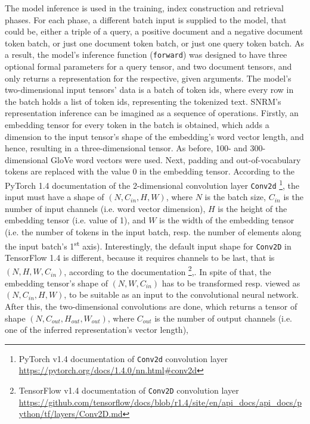 The model inference is used in the training, index construction and retrieval phases.
For each phase, a different batch input is supplied to the model, that could be,
    either a triple of a query, a positive document and a negative document token batch,
    or just one document token batch, or just one query token batch.
As a result, the model's inference function (\texttt{forward}) was designed to have three optional formal parameters for
    a query tensor, and two document tensors, and only returns a representation for
    the respective, given arguments.
The model's two-dimensional input tensors' data is a batch of token ids, where every row in the batch 
    holds a list of token ids, representing the tokenized text.
SNRM's representation inference can be imagined as a sequence of operations.
Firstly, an embedding tensor for every token in the batch is obtained, which adds a dimension
    to the input tensor's shape of the embedding's word vector length, and hence, resulting 
    in a three-dimensional tensor.
As before, 100- and 300- dimensional GloVe word vectors were used.
Next, padding and out-of-vocabulary tokens are replaced with the value 0 in the embedding tensor.
According to the PyTorch 1.4 documentation of the 2-dimensional convolution layer \texttt{Conv2d}
    \footnote{PyTorch v1.4 documentation of \texttt{Conv2d} convolution layer \url{https://pytorch.org/docs/1.4.0/nn.html\#conv2d}},
    the input must have a shape of $(N, C_{in}, H, W)$, 
    where $N$ is the batch size,
    $C_{in}$ is the number of input channels (i.e. word vector dimension),
    $H$ is the height of the embedding tensor (i.e. value of 1), and 
    $W$ is the width of the embedding tensor (i.e. the number of tokens in the input batch, 
    resp. the number of elements along the input batch's 1\textsuperscript{st} axis).
Interestingly, the default input shape for \texttt{Conv2D} in TensorFlow 1.4 is different,
    because it requires channels to be last, that is $(N, H, W, C_{in})$,
    according to the documentation
    \footnote{TensorFlow v1.4 documentation of \texttt{Conv2D} convolution layer \url{https://github.com/tensorflow/docs/blob/r1.4/site/en/api_docs/api_docs/python/tf/layers/Conv2D.md}},.
In spite of that, the embedding tensor's shape of $(N, W, C_{in})$ has to be transformed resp. 
    viewed as $(N, C_{in}, H, W)$, to be suitable as an input to the convolutional neural network.
After this, the two-dimensional convolutions are done, which returns a tensor of shape 
    $(N, C_{out}, H_{out}, W_{out})$, where 
    $C_{out}$ is the number of output channels (i.e. one of the inferred representation's vector length),
